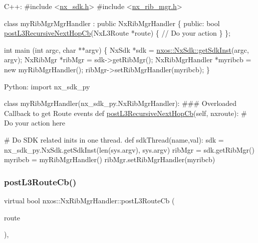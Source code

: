 \begin{DoxyCode}
C++:
\textcolor{preprocessor}{   #include <\mbox{\hyperlink{nx__sdk_8h}{nx\_sdk.h}}>}
\textcolor{preprocessor}{   #include <\mbox{\hyperlink{nx__rib__mgr_8h}{nx\_rib\_mgr.h}}>}

   \textcolor{keyword}{class }myRibMgrMgrHandler : \textcolor{keyword}{public} NxRibMgrHandler \{
      \textcolor{keyword}{public}:
         \textcolor{keywordtype}{bool} \mbox{\hyperlink{classnxos_1_1_nx_rib_mgr_handler_ae11a0ef873528002f86cd41a5871ad65}{postL3RecursiveNextHopCb}}(NxL3Route *route) \{
              \textcolor{comment}{// Do your action}
         \}
   \};

   \textcolor{keywordtype}{int}  main (\textcolor{keywordtype}{int} argc, \textcolor{keywordtype}{char} **argv)
   \{
        NxSdk    *sdk = \mbox{\hyperlink{classnxos_1_1_nx_sdk_a5050e2d26c40744b4fc7862068a83f39}{nxos::NxSdk::getSdkInst}}(argc, argv);
        NxRibMgr *ribMgr = sdk->getRibMgr();
        NxRibMgrHandler *myribcb = \textcolor{keyword}{new} myRibMgrHandler();
        ribMgr->setRibMgrHandler(myribcb);
   \}

Python:
   \textcolor{keyword}{import} nx\_sdk\_py

   \textcolor{keyword}{class }myRibMgrHandler(nx\_sdk\_py.NxRibMgrHandler):
\textcolor{preprocessor}{   ### Overloaded Callback to get Route events}
         def \mbox{\hyperlink{classnxos_1_1_nx_rib_mgr_handler_ae11a0ef873528002f86cd41a5871ad65}{postL3RecursiveNextHopCb}}(self, nxroute):
\textcolor{preprocessor}{             # Do your action here}

\textcolor{preprocessor}{   # Do SDK related inits in one thread.}
   def sdkThread(name,val):
       sdk = nx\_sdk\_py.NxSdk.getSdkInst(len(sys.argv), sys.argv)
       ribMgr = sdk.getRibMgr()
       myribcb = myRibMgrHandler()
       ribMgr.setRibMgrHandler(myribcb)
\end{DoxyCode}
 \mbox{\label{classnxos_1_1_nx_rib_mgr_handler_a1b742d50365fdece0ea47eb38300f7de}} 
\subsubsection{\texorpdfstring{post\+L3\+Route\+Cb()}{postL3RouteCb()}}
{\footnotesize\ttfamily virtual bool nxos\+::\+Nx\+Rib\+Mgr\+Handler\+::post\+L3\+Route\+Cb (\begin{DoxyParamCaption}\item[{\mbox{\hyperlink{classnxos_1_1_nx_l3_route}{Nx\+L3\+Route}} $\ast$}]{route }\end{DoxyParamCaption})\hspace{0.3cm}{\ttfamily [inline]}, {\ttfamily [virtual]}}

